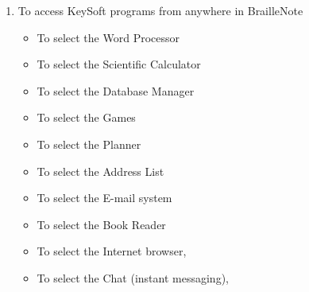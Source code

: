 \documentclass[10pt,letterpaper,twoside]{report}
\begin{document}
{{{\begin{enumerate}
\begin{itemize}
	        \item To select the Book Reader 
	        \item To select the Internet browser, 
	        \item To select the Chat (instant messaging), 
	        \item To select the Media Player, 
	        \item To select the FM Radio, p

	    \end{itemize}
	    \item To access KeySoft programs from anywhere in BrailleNote
	    	    \begin{itemize}
	        \item To select the Word Processor 
	        \item To select the Scientific Calculator 
	        \item To select the Database Manager 
	        \item To select the Games 
	        \item To select the Planner 
	        \item To select the Address List 
	        \item To select the E-mail system 
	        \item To select the Book Reader 
	        \item To select the Internet browser, 
	        \item To select the Chat (instant messaging), 

\end{itemize}
\end{enumerate}}}}
\end{document}
